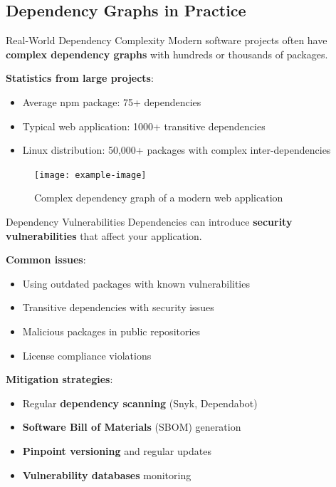 \documentclass{beamer}
\begin{document}
\subsection{Dependency Graphs in Practice}

\begin{frame}[t]{Real-World Dependency Complexity}
Modern software projects often have \textbf{complex dependency graphs} with hundreds or thousands of packages.

\bigskip

\textbf{Statistics from large projects}:
\begin{itemize}
\item Average npm package: 75+ dependencies
\item Typical web application: 1000+ transitive dependencies
\item Linux distribution: 50,000+ packages with complex inter-dependencies
\end{itemize}

\bigskip

\begin{figure}
\centering
\texttt{[image: example-image]}
\caption{Complex dependency graph of a modern web application}
\end{figure}
\end{frame}

\begin{frame}[t]{Dependency Vulnerabilities}
Dependencies can introduce \textbf{security vulnerabilities} that affect your application.

\bigskip

\textbf{Common issues}:
\begin{itemize}
\item Using outdated packages with known vulnerabilities
\item Transitive dependencies with security issues
\item Malicious packages in public repositories
\item License compliance violations
\end{itemize}

\bigskip

\textbf{Mitigation strategies}:
\begin{itemize}
\item Regular \textbf{dependency scanning} (Snyk, Dependabot)
\item \textbf{Software Bill of Materials} (SBOM) generation
\item \textbf{Pinpoint versioning} and regular updates
\item \textbf{Vulnerability databases} monitoring
\end{itemize}
\end{frame}
\end{document}
